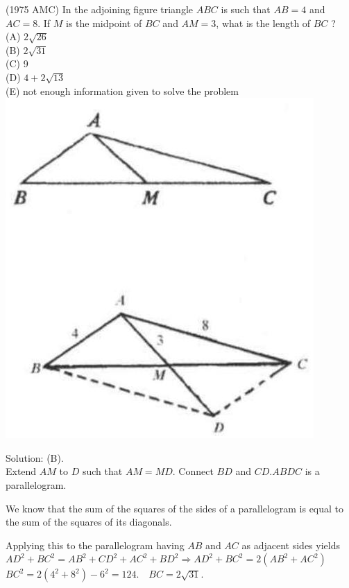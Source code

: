\documentclass{article}
\begin{document}
(1975 AMC) In the adjoining figure triangle \(A B C\) is such that \(A B=4\) and \(A C=8\). If \(M\) is the midpoint of \(B C\) and \(A M=3\), what is the length of \(B C\) ?\\
(A) \(2 \sqrt{26}\)\\
(B) \(2 \sqrt{31}\)\\
(C) 9\\
(D) \(4+2 \sqrt{13}\)\\
(E) not enough information given to solve the problem\\
\centering
\includegraphics[width=\textwidth]{images/026(2).jpg}

Solution: (B).\\
Extend \(A M\) to \(D\) such that \(A M=M D\). Connect \(B D\) and \(C D . A B D C\) is a parallelogram.

We know that the sum of the squares of the sides of a parallelogram is equal to the sum of the squares of its diagonals.

Applying this to the parallelogram having \(A B\) and \(A C\) as adjacent sides yields\\
\(A D^{2}+B C^{2}=A B^{2}+C D^{2}+A C^{2}+B D^{2} \Rightarrow A D^{2}+B C^{2}=2\left(A B^{2}+A C^{2}\right)\)\\
\(B C^{2}=2\left(4^{2}+8^{2}\right)-6^{2}=124 . \quad B C=2 \sqrt{31}\).
\end{document}
